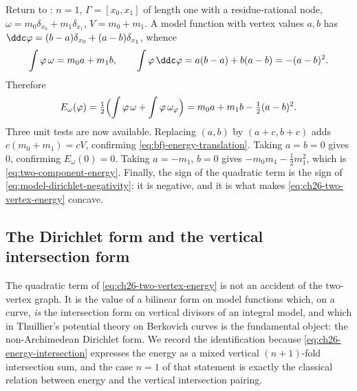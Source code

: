 \begin{example}
\label{ex:ch26-normalization-audit}
Return to : $n=1$, $\Gamma=[x_0,x_1]$ of length
one with a residue-rational node, $\omega=m_0\delta_{x_0}+m_1\delta_{x_1}$,
$V=m_0+m_1$.  A model
function with vertex values $a,b$ has
$\ddc\varphi=(b-a)\delta_{x_0}+(a-b)\delta_{x_1}$, whence
\[
 \int\varphi\,\omega=m_0a+m_1b,
 \qquad
 \int\varphi\,\ddc\varphi=a(b-a)+b(a-b)=-(a-b)^2 .
\]
Therefore
\begin{equation}
\label{eq:ch26-two-vertex-energy}
 E_\omega(\varphi)
 =\tfrac12\Bigl(\int\varphi\,\omega+\int\varphi\,\omega_\varphi\Bigr)
 =m_0a+m_1b-\tfrac12(a-b)^2 .
\end{equation}
Three unit tests are now available.  Replacing $(a,b)$ by $(a+c,b+c)$
adds $c(m_0+m_1)=cV$, confirming
\eqref{eq:bfj-energy-translation}.  Taking $a=b=0$ gives $0$, confirming
$E_\omega(0)=0$.  Taking $a=-m_1$, $b=0$ gives
$-m_0m_1-\tfrac12m_1^2$, which is \eqref{eq:two-component-energy}.  Finally,
the sign of the quadratic term is the sign of
\eqref{eq:model-dirichlet-negativity}: it is negative, and it is what makes
\eqref{eq:ch26-two-vertex-energy} concave.
\end{example}

\subsection{The Dirichlet form and the vertical intersection form}
\label{sec:ch26-dirichlet-vertical}

The quadratic term of \eqref{eq:ch26-two-vertex-energy} is not an accident of
the two-vertex graph.  It is the value of a bilinear form on model functions
which, on a curve, \emph{is} the intersection form on vertical divisors of
an integral model, and which in Thuillier's potential theory on Berkovich
curves is the fundamental object: the non-Archimedean Dirichlet form.  We
record the identification because \eqref{eq:ch26-energy-intersection}
expresses the energy as a mixed vertical $(n+1)$-fold intersection sum, and the case
$n=1$ of that statement is exactly the classical relation between energy
and the vertical intersection pairing.

